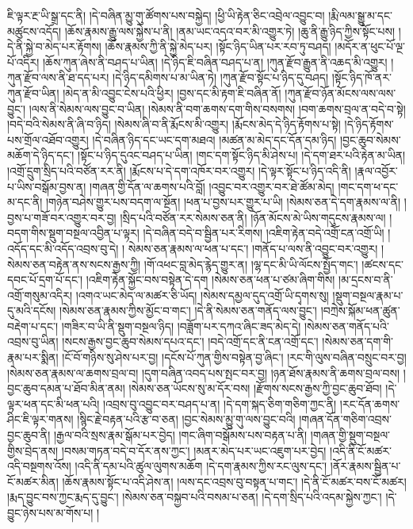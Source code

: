 ཇི་ལྟར་རྔ་ཡི་སྒྲ་དང་ནི། །དེ་བཞིན་མྱུ་གུ་ཚོགས་པས་བསྐྱེད། །ཕྱི་ཡི་རྟེན་ཅིང་འབྲེལ་འབྱུང་བ། །རྨི་ལམ་སྒྱུ་མ་དང་མཚུངས་འདོད། །ཆོས་རྣམས་རྒྱུ་ལས་སྐྱེས་པ་ནི། །ནམ་ཡང་འདའ་བར་མི་འགྱུར་ཏེ། །ཆུ་ནི་རྒྱུ་ཉིད་ཀྱིས་སྟོང་པས། །དེ་ནི་སྐྱེ་བ་མེད་པར་རྟོགས། །ཆོས་རྣམས་ཀྱི་ནི་སྐྱེ་མེད་པར། །སྟོང་ཉིད་ཡིན་པར་རབ་ཏུ་བཤད། །མདོར་ན་ཕུང་པོ་ལྔ་པོ་འདིར། །ཆོས་ཀུན་ཞེས་ནི་བཤད་པ་ཡིན། །དེ་ཉིད་ཇི་བཞིན་བཤད་པ་ན། །ཀུན་རྫོབ་རྒྱུན་ནི་འཆད་མི་འགྱུར། །ཀུན་རྫོབ་ལས་ནི་ཐ་དད་པར། །དེ་ཉིད་དམིགས་པ་མ་ཡིན་ཏེ། །ཀུན་རྫོབ་སྟོང་པ་ཉིད་དུ་བཤད། །སྟོང་ཉིད་ཁོ་ནར་ཀུན་རྫོབ་ཡིན། །མེད་ན་མི་འབྱུང་ངེས་པའི་ཕྱིར། །བྱས་དང་མི་རྟག་ཇི་བཞིན་ནོ། །ཀུན་རྫོབ་ཉོན་མོངས་ལས་ལས་བྱུང་། །ལས་ནི་སེམས་ལས་བྱུང་བ་ཡིན། །སེམས་ནི་བག་ཆགས་དག་གིས་བསགས། །བག་ཆགས་བྲལ་ན་བདེ་བ་སྟེ། །བདེ་བའི་སེམས་ནི་ཞི་བ་ཉིད། །སེམས་ཞི་བ་ནི་རྨོངས་མི་འགྱུར། །རྨོངས་མེད་དེ་ཉིད་རྟོགས་པ་སྟེ། །དེ་ཉིད་རྟོགས་པས་གྲོལ་འཐོབ་འགྱུར། །དེ་བཞིན་ཉིད་དང་ཡང་དག་མཐའ། །མཚན་མ་མེད་དང་དོན་དམ་ཉིད། །བྱང་ཆུབ་སེམས་མཆོག་དེ་ཉིད་དང་། །སྟོང་པ་ཉིད་དུའང་བཤད་པ་ཡིན། །གང་དག་སྟོང་ཉིད་མི་ཤེས་པ། །དེ་དག་ཐར་པའི་རྟེན་མ་ཡིན། །འགྲོ་དྲུག་སྲིད་པའི་བཙོན་རར་ནི། །རྨོངས་པ་དེ་དག་འཁོར་བར་འགྱུར། །དེ་ལྟར་སྟོང་པ་ཉིད་འདི་ནི། །རྣལ་འབྱོར་པ་ཡིས་བསྒོམ་བྱས་ན། །གཞན་གྱི་དོན་ལ་ཆགས་པའི་བློ། །འབྱུང་བར་འགྱུར་བར་ཐེ་ཚོམ་མེད། །གང་དག་ཕ་དང་མ་དང་ནི། །གཉེན་བཤེས་གྱུར་པས་བདག་ལ་སྔོན། །ཕན་པ་བྱས་པར་གྱུར་པ་ཡི། །སེམས་ཅན་དེ་དག་རྣམས་ལ་ནི། །བྱས་པ་གཟོ་བར་འགྱུར་བར་བྱ། །སྲིད་པའི་བཙོན་རར་སེམས་ཅན་ནི། །ཉོན་མོངས་མེ་ཡིས་གདུངས་རྣམས་ལ། །བདག་གིས་སྡུག་བསྔལ་འབྱིན་པ་ལྟར། །དེ་བཞིན་བདེ་བ་སྦྱིན་པར་རིགས། །འཇིག་རྟེན་བདེ་འགྲོ་ངན་འགྲོ་ཡི། །འདོད་དང་མི་འདོད་འབྲས་བུ་དེ། །
སེམས་ཅན་རྣམས་ལ་ཕན་པ་དང་། །གནོད་པ་ལས་ནི་འབྱུང་བར་འགྱུར། །སེམས་ཅན་བརྟེན་ནས་སངས་རྒྱས་ཀྱི། །གོ་འཕང་བླ་མེད་རྙེད་གྱུར་ན། །ལྷ་དང་མི་ཡི་ལོངས་སྤྱོད་གང་། །ཚངས་དང་དབང་པོ་དྲག་པོ་དང་། །འཇིག་རྟེན་སྐྱོང་བས་བསྟེན་དེ་དག །སེམས་ཅན་ཕན་པ་ཙམ་ཞིག་གིས། །མ་དྲངས་བ་ནི་འགྲོ་གསུམ་འདིར། །འགའ་ཡང་མེད་ལ་མཚར་ཅི་ཡོད། །སེམས་དམྱལ་དུད་འགྲོ་ཡི་དྭགས་སུ། །སྡུག་བསྔལ་རྣམ་པ་དུ་མའི་དངོས། །སེམས་ཅན་རྣམས་ཀྱིས་མྱོང་བ་གང་། །དེ་ནི་སེམས་ཅན་གནོད་ལས་བྱུང་། །བཀྲེས་སྐོམ་ཕན་ཚུན་བརྡེག་པ་དང་། །གཟིར་བ་ཡི་ནི་སྡུག་བསྔལ་ཉིད། །བཟློག་པར་དཀའ་ཞིང་ཟད་མེད་དེ། །སེམས་ཅན་གནོད་པའི་འབྲས་བུ་ཡིན། །སངས་རྒྱས་བྱང་ཆུབ་སེམས་དཔའ་དང་། །བདེ་འགྲོ་དང་ནི་ངན་འགྲོ་དང་། །སེམས་ཅན་དག་གི་རྣམ་པར་སྨིན། །ངོ་བོ་གཉིས་སུ་ཤེས་པར་བྱ། །དངོས་པོ་ཀུན་གྱིས་བསྟེན་བྱ་ཞིང་། །རང་གི་ལུས་བཞིན་བསྲུང་བར་བྱ། །སེམས་ཅན་རྣམས་ལ་ཆགས་བྲལ་བ། །དུག་བཞིན་འབད་པས་སྤང་བར་བྱ། །ཉན་ཐོས་རྣམས་ནི་ཆགས་བྲལ་བས། །བྱང་ཆུབ་དམན་པ་ཐོབ་མིན་ནམ། །སེམས་ཅན་ཡོངས་སུ་མ་དོར་བས། །རྫོགས་སངས་རྒྱས་ཀྱི་བྱང་ཆུབ་ཐོབ། །དེ་ལྟར་ཕན་དང་མི་ཕན་པའི། །འབྲས་བུ་འབྱུང་བར་བཤད་པ་ན། །དེ་དག་སྐད་ཅིག་གཅིག་ཀྱང་ནི། །རང་དོན་ཆགས་ཤིང་ཇི་ལྟར་གནས། །སྙིང་རྗེ་བརྟན་པའི་རྩ་བ་ཅན། །བྱང་སེམས་མྱུ་གུ་ལས་བྱུང་བའི། །གཞན་དོན་གཅིག་འབྲས་བྱང་ཆུབ་ནི། །རྒྱལ་བའི་སྲས་རྣམ་སྒོམ་པར་བྱེད། །གང་ཞིག་བསྒོམས་པས་བརྟན་པ་ནི། །གཞན་གྱི་སྡུག་བསྔལ་གྱིས་བྲེད་ནས། །བསམ་གཏན་བདེ་བ་དོར་ནས་ཀྱང་། །མནར་མེད་པར་ཡང་འཇུག་པར་བྱེད། །འདི་ནི་ངོ་མཚར་འདི་བསྔགས་འོས། །འདི་ནི་དམ་པའི་ཚུལ་ལུགས་མཆོག །དེ་དག་རྣམས་ཀྱིས་རང་ལུས་དང་། །ནོར་རྣམས་སྦྱིན་པ་ངོ་མཚར་མིན། །ཆོས་རྣམས་སྟོང་པ་འདི་ཤེས་ན། །ལས་དང་འབྲས་བུ་བསྟན་པ་གང་། །དེ་ནི་ངོ་མཚར་བས་ངོ་མཚར། །རྨད་བྱུང་བས་ཀྱང་རྨད་དུ་བྱུང་། །སེམས་ཅན་བསྐྱབ་པའི་བསམ་པ་ཅན། །དེ་དག་སྲིད་པའི་འདམ་སྐྱེས་ཀྱང་། །དེ་བྱུང་ཉེས་པས་མ་གོས་པ། །
